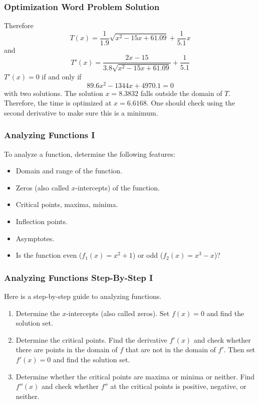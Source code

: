 \documentclass[xcolor=dvipsnames]{beamer}
\begin{document}
\begin{frame}
  \frametitle{Optimization Word Problem Solution}
Therefore
\begin{equation}
  \label{eq:iegaexov}
  T(x)=\frac{1}{1.9}\sqrt{x^{2}-15x+61.09}+\frac{1}{5.1}x
\end{equation}
and
\begin{equation}
  \label{eq:ahwohmoo}
  T'(x)=\frac{2x-15}{3.8\sqrt{x^{2}-15x+61.09}}+\frac{1}{5.1}
\end{equation}
$T'(x)=0$ if and only if
\begin{equation}
  \label{eq:phieghen}
  89.6x^{2}-1344x+4970.1=0
\end{equation}
with two solutions. The solution $x=8.3832$ falls outside the domain
of $T$. Therefore, the time is optimized at $x=6.6168$. One should
check using the second derivative to make sure this is a minimum.
\end{frame}

\begin{frame}
  \frametitle{Analyzing Functions I}
To analyze a function, determine the following features:
\begin{itemize}
\item Domain and range of the function.
\item Zeros (also called $x$-intercepts) of the function.
\item Critical points, maxima, minima.
\item Inflection points.
\item Asymptotes.
\item Is the function even ($f_{1}(x)=x^{2}+1$) or odd ($f_{2}(x)=x^{3}-x$)?
\end{itemize}
\end{frame}

\begin{frame}
  \frametitle{Analyzing Functions Step-By-Step I}
Here is a step-by-step guide to analyzing functions.
\begin{enumerate}
\item Determine the $x$-intercepts (also called zeros). Set $f(x)=0$
  and find the solution set.
\item Determine the critical points. Find the derivative $f'(x)$ and
  check whether there are points in the domain of $f$ that are not in
  the domain of $f'$. Then set $f'(x)=0$ and find the solution set.
\item Determine whether the critical points are maxima or minima or
  neither. Find $f''(x)$ and check whether $f''$ at the critical
  points is positive, negative, or neither. 
\end{enumerate}
\end{frame}
\end{document}
